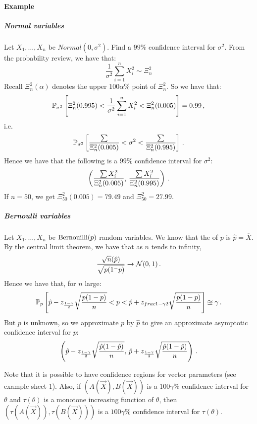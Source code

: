\paragraph{Example}

\subparagraph{Normal variables}

Let $X_1, \dotsc, X_n$ be \iid $Normal(0, \sigma^2)$. Find a $99\%$ confidence interval for $\sigma^2$.
From the probability review, we have that:
\[
\frac{1}{\sigma^2}\sum_{i=1}^n X_i^2 \sim \Xi^2_n
\]
Recall $\Xi^2_n(\alpha)$ denotes the upper $100\alpha\%$ point of $\Xi^2_n$.
So we have that:
\[
\mathbb{P}_{\sigma^2} \left[ \Xi^2_n(0.995) < \frac{1}{\sigma^2}\sum_{i=1}^n X_i^2 < \Xi^2_n(0.005) \right] = 0.99 \, {,}
\]
i.e.
\[
\mathbb{P}_{\sigma^2} \left[ \frac{\sum}{\Xi^2_n(0.005)} < \sigma^2 < \frac{\sum}{\Xi^2_n(0.995)} \right] \, {.}
\]
Hence we have that the following is a $99\%$ confidence interval for $\sigma^2$:
\[
\left(\frac{\sum X_i^2}{\Xi^2_n(0.005)}, \, \frac{\sum X_i^2}{\Xi^2_n(0.995)} \right) \, {.}
\]
If $n = 50$, we get $\Xi^2_{50}(0.005) = 79.49$ and $\Xi^2_{50} = 27.99$. 

\subparagraph{Bernoulli variables}

Let $X_1, \dotsc, X_n$ be \iid $\text{Bernouilli}(p)$ random variables. We know that the \mle of $p$ is $\hat{p} = \overline{X}$.
By the central limit theorem, we have that as $n$ tends to infinity, 
\[
\frac{\sqrt{n}(\hat{p})}{\sqrt{p(1^-p)}} \rightarrow \mathcal{N}(0, 1) \, {.}
\]
Hence we have that, for $n$ large:
\[
\mathbb{P}_p \left[ \hat{p} - z_{\frac{1-\gamma}{2}}\sqrt{\frac{p(1-p)}{n}} < p < \hat{p} + z_{frac{1-\gamma}{2}} \sqrt{\frac{p(1-p)}{n}} \right] \approxeq \gamma \, {.}
\]
But $p$ is unknown, so we approximate $p$ by $\hat{p}$ to give an approximate asymptotic confidence interval for $p$:
\[
\left( \hat{p} - z_{\frac{1-\gamma}{2}}\sqrt{\frac{\hat{p}(1-\hat{p})}{n}}, \, \hat{p} + z_{\frac{1-\gamma}{2}}\sqrt{\frac{\hat{p}(1-\hat{p})}{n}} \right) \, {.}
\]

Note that it is possible to have confidence regions for vector parameters (see example sheet 1). Also, if $\left(A(\vec{X}), B(\vec{X})\right)$ is a $100\gamma\%$ confidence interval for $\theta$ and $\tau(\theta)$ is a monotone increasing function of $\theta$, then $\left(\tau(A(\vec{X})), \tau(B(\vec{X}))\right)$ is a $100\gamma\%$ confidence interval for $\tau(\theta)$.




